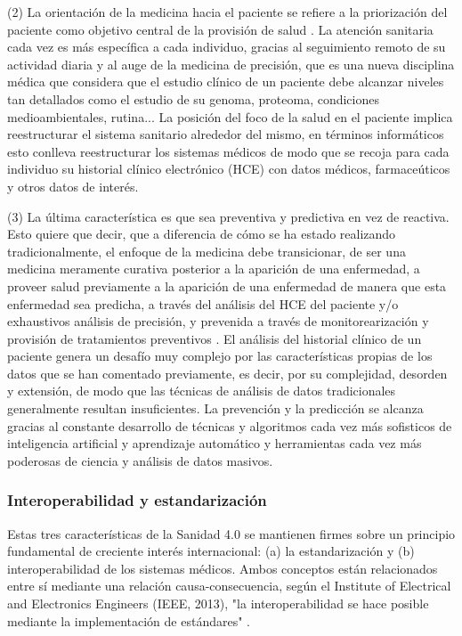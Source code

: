 (2) La orientación de la medicina hacia el paciente se refiere a la priorización del paciente como objetivo central de la provisión de salud  \cite{tortorella2020healthcare}. La atención sanitaria cada vez es más específica a cada individuo, gracias al seguimiento remoto de su actividad diaria y al auge de la medicina de precisión, que es una nueva disciplina médica que considera que el estudio clínico de un paciente debe alcanzar niveles tan detallados como el estudio de su genoma, proteoma, condiciones medioambientales, rutina... La posición del foco de la salud en el paciente implica reestructurar el sistema sanitario alrededor del mismo, en términos informáticos esto conlleva reestructurar los sistemas médicos de modo que se recoja para cada individuo su historial clínico electrónico (HCE) con datos médicos, farmaceúticos y otros datos de interés. 



(3) La última característica es que sea preventiva y predictiva en vez de reactiva. Esto quiere que decir, que a diferencia de cómo se ha estado realizando tradicionalmente, el enfoque de la medicina debe transicionar, de ser una medicina meramente curativa posterior a la aparición de una enfermedad, a proveer salud previamente a la aparición de una enfermedad de manera que esta enfermedad sea predicha, a través del análisis del HCE del paciente y/o exhaustivos análisis de precisión, y prevenida a través de monitorearización y provisión de tratamientos preventivos \cite{ruiz2023inteligencia}. El análisis del historial clínico de un paciente genera un desafío muy complejo por las características propias de los datos que se han comentado previamente, es decir, por su complejidad, desorden y extensión, de modo que las técnicas de análisis de datos tradicionales generalmente resultan insuficientes. La prevención y la predicción se alcanza gracias al constante desarrollo de técnicas y algoritmos cada vez más sofisticos de inteligencia artificial y aprendizaje automático y herramientas cada vez más poderosas de ciencia y análisis de datos masivos.


\subsubsection{Interoperabilidad y estandarización}

Estas tres características de la Sanidad 4.0 se mantienen firmes sobre un principio fundamental de creciente interés internacional: (a) la estandarización y (b) interoperabilidad de los sistemas médicos. Ambos conceptos están relacionados entre sí mediante una relación causa-consecuencia, según el Institute of Electrical and Electronics Engineers (IEEE, 2013), "la interoperabilidad se hace posible mediante la implementación de estándares" \cite{berryman2013data}.

